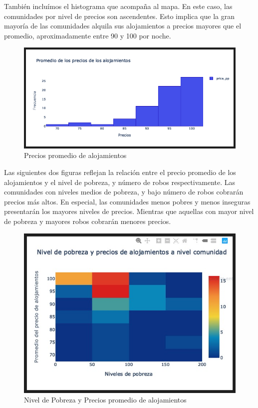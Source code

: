 \documentclass[11pt, spanish]{article}
\begin{document}
\indent También incluímos el histograma que acompaña al mapa. En este caso, las comunidades por nivel de precios son ascendentes. Esto implica que la gran mayoría de las comunidades alquila sus alojamientos a precios mayores que el promedio, aproximadamente entre 90 y 100 por noche.

\begin{figure}[hbtp]
\caption{Precios promedio de alojamientos}
\centering
\includegraphics[width=12cm]{Pregra.jpg}
\end{figure}

\indent Las siguientes dos figuras reflejan la relación entre el precio promedio de los alojamientos y el nivel de pobreza, y número de robos respectivamente. Las comunidades con niveles medios de pobreza, y bajo número de robos cobrarán precios más altos. En especial, las comunidades menos pobres y menos inseguras presentarán los mayores niveles de precios. Mientras que aquellas con mayor nivel de pobreza y mayores robos cobrarán menores precios. 

\begin{figure}[hbtp]
\caption{Nivel de Pobreza y Precios promedio de alojamientos}
\centering
\includegraphics[width=12cm]{Pobpre.jpg}
\end{figure}
\end{document}
